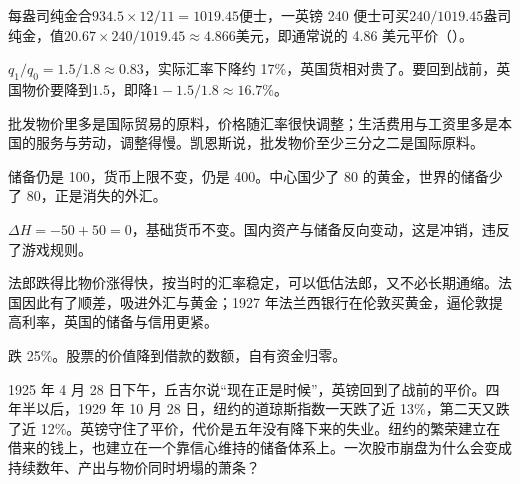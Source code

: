 \begin{answers}
\item 每盎司纯金合$934.5\times12/11=1019.45$便士，一英镑 240 便士可买$240/1019.45$盎司纯金，值$20.67\times240/1019.45\approx4.866$美元，即通常说的 4.86 美元平价（）。
\item $q_1/q_0=1.5/1.8\approx0.83$，实际汇率下降约 17\%，英国货相对贵了。要回到战前，英国物价要降到$1.5$，即降$1-1.5/1.8\approx16.7\%$。
\item 批发物价里多是国际贸易的原料，价格随汇率很快调整；生活费用与工资里多是本国的服务与劳动，调整得慢。凯恩斯说，批发物价至少三分之二是国际原料。
\item 储备仍是 100，货币上限不变，仍是 400。中心国少了 80 的黄金，世界的储备少了 80，正是消失的外汇。
\item $\Delta H=-50+50=0$，基础货币不变。国内资产与储备反向变动，这是冲销，违反了游戏规则。
\item 法郎跌得比物价涨得快，按当时的汇率稳定，可以低估法郎，又不必长期通缩。法国因此有了顺差，吸进外汇与黄金；1927 年法兰西银行在伦敦买黄金，逼伦敦提高利率，英国的储备与信用更紧。
\item 跌 25\%。股票的价值降到借款的数额，自有资金归零。
\end{answers}

1925 年 4 月 28 日下午，丘吉尔说“现在正是时候”，英镑回到了战前的平价\cite{hansard1925}。四年半以后，1929 年 10 月 28 日，纽约的道琼斯指数一天跌了近 13\%，第二天又跌了近 12\%\cite{frh2013}。英镑守住了平价，代价是五年没有降下来的失业。纽约的繁荣建立在借来的钱上，也建立在一个靠信心维持的储备体系上。一次股市崩盘为什么会变成持续数年、产出与物价同时坍塌的萧条？
